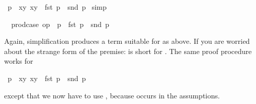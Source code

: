 \begin{isabellebody}
\ {}p\ {}\ {}{}x{}y{}{}\ x{}y{}\ {}\ fst\ p\ {}\ snd\ p{}\isanewline
%
\isadelimproof
%
\endisadelimproof
%
\isatagproof
{}\isamarkupfalse%
\ simp%
\begin{isamarkuptxt}%
\begin{isabelle}%
\ {}{}\ prod{}case\ op\ {}\ p\ {}\ fst\ p\ {}\ snd\ p%
\end{isabelle}
Again, simplification produces a term suitable for 
as above. If you are worried about the strange form of the premise:
 is short for .
The same proof procedure works for%
\end{isamarkuptxt}%
\isamarkuptrue%
%
\endisatagproof
{\isafoldproof}%
%
\isadelimproof
%
\endisadelimproof
{}\isamarkupfalse%
\ {}p\ {}\ {}{}x{}y{}{}\ x{}y{}\ {}\ fst\ p\ {}\ snd\ p{}%
\isadelimproof
%
\endisadelimproof
%
\isatagproof
%
\begin{isamarkuptxt}%
\noindent
except that we now have to use , because
 occurs in the assumptions.


\end{isamarkuptxt}
\end{isabellebody}
